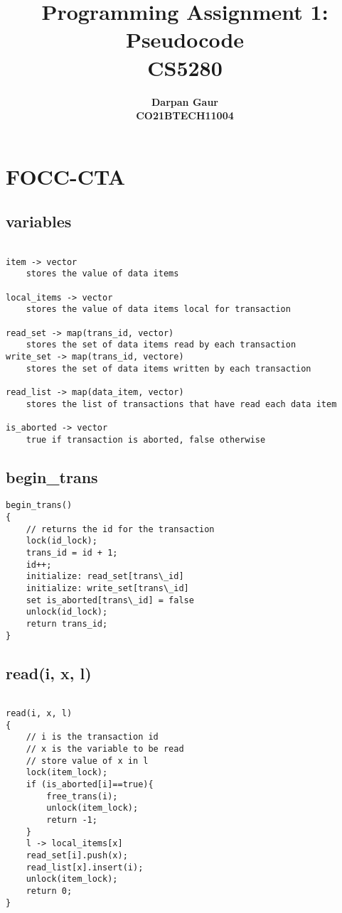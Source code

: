 \documentclass[12pt]{article}
\title{
    \textbf{Programming Assignment 1: Pseudocode} \\ 
    \textbf{CS5280} \\
}
\author{
    \textbf{Darpan Gaur} \\
    \textbf{CO21BTECH11004}
}
\date{}
\begin{document}
\maketitle

\hrulefill

\section*{FOCC-CTA}

\subsection*{variables}
\begin{lstlisting}

item -> vector 
    stores the value of data items 

local_items -> vector
    stores the value of data items local for transaction

read_set -> map(trans_id, vector)  
    stores the set of data items read by each transaction
write_set -> map(trans_id, vectore)  
    stores the set of data items written by each transaction

read_list -> map(data_item, vector)  
    stores the list of transactions that have read each data item

is_aborted -> vector
    true if transaction is aborted, false otherwise

\end{lstlisting}

\subsection*{begin\_trans}

\begin{lstlisting}
begin_trans()
{
    // returns the id for the transaction
    lock(id_lock);
    trans_id = id + 1;
    id++;
    initialize: read_set[trans\_id]
    initialize: write_set[trans\_id]
    set is_aborted[trans\_id] = false 
    unlock(id_lock);
    return trans_id;
}
\end{lstlisting}

\subsection*{read(i, x, l)}

\begin{lstlisting}

read(i, x, l)
{
    // i is the transaction id
    // x is the variable to be read
    // store value of x in l
    lock(item_lock);
    if (is_aborted[i]==true){
        free_trans(i);
        unlock(item_lock);
        return -1;
    }    
    l -> local_items[x]
    read_set[i].push(x);
    read_list[x].insert(i);
    unlock(item_lock);
    return 0;
}

\end{lstlisting}
\end{document}
